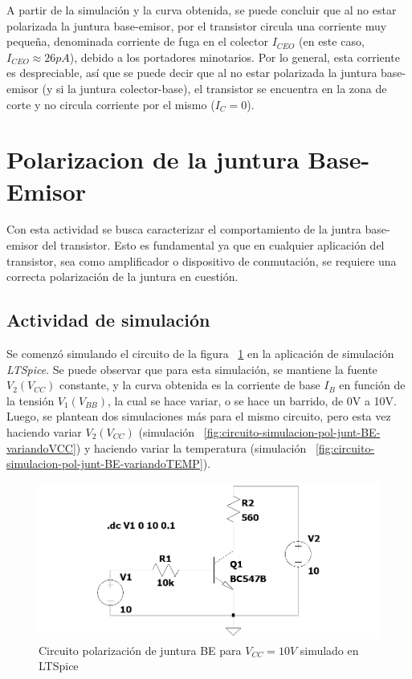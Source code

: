 \documentclass[chaptersright]{informeutn}
\begin{document}
  A partir de la simulación y la curva obtenida, se puede concluir
  que al no estar polarizada la juntura base-emisor, por el transistor
  circula una corriente muy pequeña, denominada corriente de fuga en
  el colector $I_{CEO}$ (en este caso, $I_{CEO}\approx26pA$), debido a 
  los portadores minotarios. Por lo general, esta corriente es 
  despreciable, así que se puede decir que al no estar polarizada la
  juntura base-emisor (y si la juntura colector-base), el transistor
  se encuentra en la zona de corte y no circula
  corriente por el mismo ($I_C = 0$).
  
  \section{Polarizacion de la juntura Base-Emisor}
    Con esta actividad se busca caracterizar el comportamiento de la
    juntra base-emisor del transistor. Esto es fundamental ya que en
    cualquier aplicación del transistor, sea como amplificador o
    dispositivo de conmutación, se requiere una correcta polarización
    de la juntura en cuestión.
    
    \subsection{Actividad de simulación}
    Se comenzó simulando el circuito de la figura ~\ref{fig:circuito-simulacion-pol-junt-BE} en la aplicación de simulación
    \textit{LTSpice}. Se puede observar que para esta simulación, se
    mantiene la fuente $V_2 (V_{CC})$ constante, y la curva obtenida
    es la corriente de base $I_B$ en función de la tensión $V_1(V_{BB})$, la cual se hace variar, o se hace un barrido, de 0V a 10V.
    Luego, se plantean dos simulaciones más para el mismo circuito, 
    pero esta vez haciendo variar $V_2 (V_{CC})$ (simulación 
    ~\ref{fig:circuito-simulacion-pol-junt-BE-variandoVCC}) y haciendo
    variar la temperatura (simulación ~\ref{fig:circuito-simulacion-pol-junt-BE-variandoTEMP}).

    \begin{figure}[H]
        \centering
        \includegraphics[width=1\textwidth, keepaspectratio]{pictures/circuito-simulacion-pol-junt-BE.png}
        \caption{Circuito polarización de juntura BE para $V_{CC} = 10V$ simulado en LTSpice}
        \label{fig:circuito-simulacion-pol-junt-BE}
    \end{figure}
\end{document}
